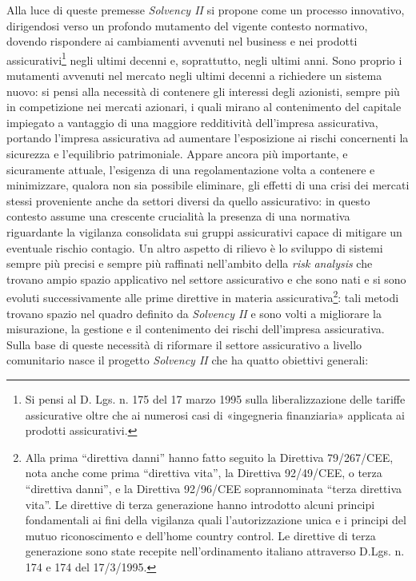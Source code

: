 Alla luce di queste premesse \textit{\textit{Solvency I}I} si propone come un processo innovativo, dirigendosi verso un profondo mutamento del vigente contesto normativo, dovendo rispondere ai cambiamenti avvenuti nel business e nei prodotti assicurativi\footnote{Si pensi al D. Lgs. n. 175 del 17 marzo 1995 sulla liberalizzazione delle tariffe assicurative oltre che ai numerosi casi di «ingegneria finanziaria» applicata ai prodotti assicurativi.} negli ultimi decenni e, soprattutto, negli ultimi anni. 
Sono proprio i mutamenti avvenuti nel mercato negli ultimi decenni a richiedere un sistema nuovo: si pensi alla necessità di contenere gli interessi degli azionisti, sempre più in competizione nei mercati azionari, i quali mirano al contenimento del capitale impiegato a vantaggio di una maggiore redditività dell’impresa assicurativa, portando l’impresa assicurativa ad aumentare l’esposizione ai rischi concernenti la sicurezza e l’equilibrio patrimoniale.
Appare ancora più importante, e sicuramente attuale, l’esigenza di una regolamentazione volta a contenere e minimizzare, qualora non sia possibile eliminare, gli effetti di una crisi dei mercati stessi proveniente anche da settori diversi da quello assicurativo: in questo contesto assume una crescente crucialità la presenza di una normativa riguardante la vigilanza consolidata sui gruppi assicurativi capace di mitigare un eventuale rischio contagio.
Un altro aspetto di rilievo è lo sviluppo di sistemi sempre più precisi e sempre più raffinati nell’ambito della \textit{risk analysis} che trovano ampio spazio applicativo nel settore assicurativo e che sono nati e si sono evoluti successivamente alle prime direttive in materia assicurativa\footnote{Alla prima “direttiva danni” hanno fatto seguito la Direttiva 79/267/CEE, nota anche come prima “direttiva vita”, la Direttiva 92/49/CEE, o terza “direttiva danni”, e la Direttiva 92/96/CEE soprannominata “terza direttiva vita”. Le direttive di terza generazione hanno introdotto alcuni principi fondamentali ai fini della vigilanza quali l’autorizzazione unica e i principi del mutuo riconoscimento e dell’home country control. Le direttive di terza generazione sono state recepite nell’ordinamento italiano attraverso D.Lgs. n. 174 e 174 del 17/3/1995.}: tali metodi trovano spazio nel quadro definito da \textit{\textit{Solvency I}I} e sono volti a migliorare la misurazione, la gestione e il contenimento dei rischi dell’impresa assicurativa.
Sulla base di queste necessità di riformare il settore assicurativo a livello comunitario nasce il progetto \textit{\textit{Solvency I}I} che ha quatto obiettivi generali:

